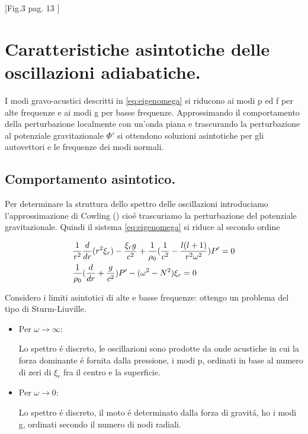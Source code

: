 \documentclass[../main.tex]{subfiles}
\begin{document}
[Fig.3 pag. 13 \cite{chr02helioseismology}]


{\let\clearpage\relax           %
\chapter{Caratteristiche asintotiche delle oscillazioni adiabatiche.}\label{chap:asyntoticbehavour}
}


I modi gravo-acustici descritti in \eqref{eq:eigenomega} si riducono ai modi p ed f per alte frequenze e ai modi g per basse frequenze. Approssimando il comportamento della perturbazione localmente con un'onda piana e trascurando la perturbazione al potenziale gravitazionale $\Phi'$ si ottendono soluzioni asintotiche per gli autovettori e le frequenze dei modi normali.

\section{Comportamento asintotico.}

Per determinare la struttura dello spettro delle oscillazioni introduciamo l'approssimazione di Cowling (\cite{cow41oscillations}) cio\'e trascuriamo la perturbazione del potenziale gravitazionale. Quindi il sistema \eqref{eq:eigenomega} si riduce al secondo ordine

\begin{align}
&\frac{1}{r^2}\frac{d}{d r}(r^2\xi_r)-\frac{\xi_rg}{c^2}+\frac{1}{\rho_0}(\frac{1}{c^2}-\frac{l(l+1)}{r^2\omega^2})P'=0\label{eq:cowosc}\\
&\frac{1}{\rho_0}(\frac{d}{d r}+\frac{g}{c^2})P'-(\omega^2-N^2)\xi_r=0\nonumber
\end{align}

Considero i limiti asintotici di alte e basse frequenze: ottengo un problema del tipo di Sturm-Liuville.

\begin{itemize}
\item Per $\omega\to\infty$:

Lo spettro \'e discreto, le oscillazioni sono prodotte da onde acustiche in cui la forza dominante \'e fornita dalla pressione, i modi p, ordinati in base al numero di zeri di $\xi_r$ fra il centro e la superficie.

\item Per $\omega\to0$:

Lo spettro \'e discreto, il moto \'e determinato dalla forza di gravit\'a, ho i modi g, ordinati secondo il numero di nodi radiali.

\end{itemize}
\end{document}
